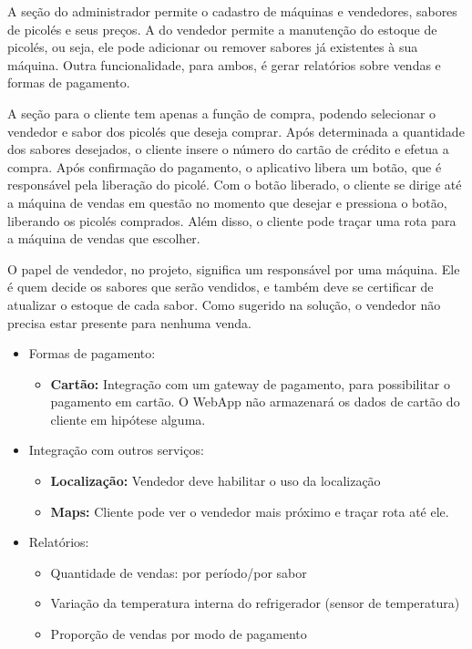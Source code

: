 A seção do administrador permite o cadastro de máquinas e vendedores, sabores de picolés e seus preços. A do vendedor permite a manutenção do estoque de picolés, ou seja, ele pode adicionar ou remover sabores já existentes à sua máquina. Outra funcionalidade, para ambos, é gerar relatórios sobre vendas e formas de pagamento.

A seção para o cliente tem apenas a função de compra, podendo selecionar o vendedor e sabor dos picolés que deseja comprar. Após determinada a quantidade dos sabores desejados, o cliente insere o número do cartão de crédito e efetua a compra. Após confirmação do pagamento, o aplicativo libera um botão, que é responsável pela liberação do picolé. Com o botão liberado, o cliente se dirige até a máquina de vendas em questão no momento que desejar e pressiona o botão, liberando os picolés comprados. Além disso, o cliente pode traçar uma rota para a máquina de vendas que escolher.

O papel de vendedor, no projeto, significa um responsável por uma máquina. Ele é quem decide os sabores que serão vendidos, e também deve se certificar de atualizar o estoque de cada sabor. Como sugerido na solução, o vendedor não precisa estar presente para nenhuma venda.

\begin{itemize}
	\item Formas de pagamento:
    \begin{itemize}
        \item \textbf{Cartão:} Integração com um gateway de pagamento, para possibilitar o pagamento em cartão. O WebApp não armazenará os dados de cartão do cliente em hipótese alguma.
  	\end{itemize}

	\item Integração com outros serviços:
  	\begin{itemize}
    	\item \textbf{Localização:} Vendedor deve habilitar o uso da localização
    	\item \textbf{Maps:} Cliente pode ver o vendedor mais próximo e traçar rota até ele.
  	\end{itemize}

	\item Relatórios:
  	\begin{itemize}
        \item Quantidade de vendas: por período/por sabor
        \item Variação da temperatura interna do refrigerador (sensor de temperatura)
        \item Proporção de vendas por modo de pagamento
  	\end{itemize}
\end{itemize}

